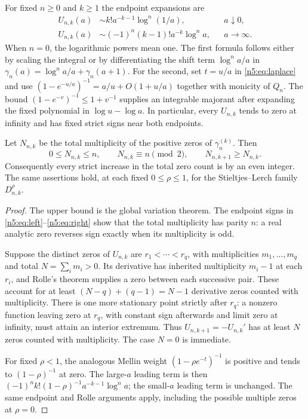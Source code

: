 For fixed $n\geq0$ and $k\geq1$ the endpoint expansions are
\begin{align}
 U_{n,k}(a)&\sim k!a^{-k-1}\log^n(1/a),&&a\downarrow0,\label{n5:eq:left}\\
 U_{n,k}(a)&\sim(-1)^n(k-1)!a^{-k}\log^n a,&&a\to\infty.
 \label{n5:eq:right}
\end{align}
When $n=0$, the logarithmic powers mean one.  The first formula follows
either by scaling the integral or by differentiating the shift term
$\log^n a/a$ in
$\gamma_n(a)=\log^n a/a+\gamma_n(a+1)$.  For the second, set $t=u/a$ in
\eqref{n5:eq:laplace} and use
$(1-e^{-u/a})^{-1}=a/u+O(1+u/a)$ together with monicity of $Q_n$.
The bound
$(1-e^{-v})^{-1}\leq1+v^{-1}$ supplies an integrable majorant after
expanding the fixed polynomial in $\log u-\log a$.
In particular, every $U_{n,k}$ tends to zero at infinity and has fixed
strict signs near both endpoints.

\begin{proposition}
\label{n5:prop:count}
Let $N_{n,k}$ be the total multiplicity of the positive zeros of
$\gamma_n^{(k)}$.  Then
\begin{equation}\label{n5:eq:count-law}
 0\leq N_{n,k}\leq n,\qquad
 N_{n,k}\equiv n\pmod2,\qquad N_{n,k+1}\geq N_{n,k}.
\end{equation}
Consequently every strict increase in the total zero count is by an even
integer.  The same assertions hold, at each fixed
$0\leq\rho\leq1$, for the Stieltjes--Lerch family
$D_{n,k}^{\rho}$.
\end{proposition}
\begin{proof}
The upper bound is the global variation theorem.  The endpoint signs in
\eqref{n5:eq:left}--\eqref{n5:eq:right} show that the total multiplicity
has parity $n$: a real analytic zero reverses sign exactly when its
multiplicity is odd.

Suppose the distinct zeros of $U_{n,k}$ are
$r_1<\cdots<r_q$, with multiplicities $m_1,\ldots,m_q$ and
total $N=\sum_i m_i>0$.  Its derivative has inherited multiplicity
$m_i-1$ at each $r_i$, and Rolle's theorem supplies a zero between each
successive pair.  These account for at least
$(N-q)+(q-1)=N-1$ derivative zeros counted with multiplicity.  There is one
more stationary point strictly after $r_q$: a nonzero function leaving
zero at $r_q$, with constant sign afterwards and limit zero at infinity,
must attain an interior extremum.  Thus $U_{n,k+1}=-U_{n,k}'$ has at least
$N$ zeros counted with multiplicity.  The case $N=0$ is immediate.

For fixed $\rho<1$, the analogous Mellin weight
$(1-\rho e^{-t})^{-1}$ is positive and tends to $(1-\rho)^{-1}$ at zero.
The large-$a$ leading term is then
$(-1)^n k!(1-\rho)^{-1}a^{-k-1}\log^n a$; the small-$a$ leading term
is unchanged.  The same endpoint and Rolle arguments apply, including
the possible multiple zeros at $\rho=0$.
\end{proof}

